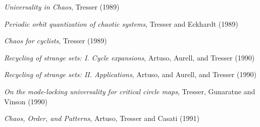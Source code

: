 {\em {Universality in Chaos}},
{Tresser}
{(1989)}

{\em Periodic orbit quantization of chaotic systems},
{Tresser and Eckhardt}
{(1989)}

{\em Chaos for cyclists},
{Tresser}
{(1989)}

{\em Recycling of strange sets: {I. Cycle} expansions},
{Artuso, Aurell, and Tresser}
{(1990)}

{\em Recycling of strange sets: {II. Applications}},
{Artuso, and Aurell, and Tresser}
{(1990)}

{\em On the mode-locking universality for critical circle maps},
{Tresser, Gunaratne and Vinson}
{(1990)}

{\em {Chaos, Order, and Patterns}},
{Artuso, Tresser and Casati}
{(1991)}

